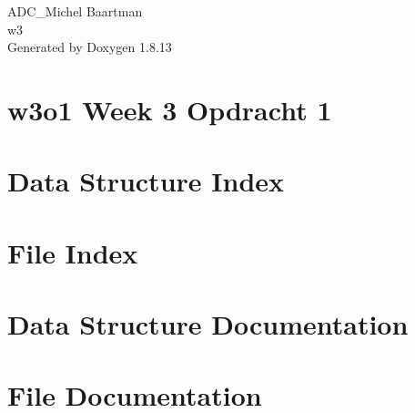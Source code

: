 \documentclass[twoside]{book}
\newcommand{\+}{\discretionary{\mbox{\scriptsize$\hookleftarrow$}}{}{}}
\newcommand{\clearemptydoublepage}{%
  \newpage{\pagestyle{empty}\cleardoublepage}%
}
\begin{document}
\hypersetup{pageanchor=false,
             bookmarksnumbered=true,
             pdfencoding=unicode
            }
\begin{titlepage}
\vspace*{7cm}
\begin{center}%
{\Large A\+D\+C\+\_\+\+Michel Baartman \\[1ex]\large w3 }\\
\vspace*{1cm}
{\large Generated by Doxygen 1.8.13}\\
\end{center}
\end{titlepage}
\clearemptydoublepage
{}
\tableofcontents
\clearemptydoublepage
{}
\hypersetup{pageanchor=true}

\chapter{w3o1 Week 3 Opdracht 1}
\label{index}\hypertarget{index}{}
\chapter{Data Structure Index}

\chapter{File Index}

\chapter{Data Structure Documentation}

\chapter{File Documentation}














































\backmatter
\newpage
{}
\clearemptydoublepage
{}
\printindex
\end{document}

